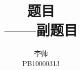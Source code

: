 \documentclass[a4paper]{article}
\title{题目\\ \small ——副题目}
\author{李帅\\PB10000313}
\begin{document}
\maketitle
\tableofcontents
\pagebreak
\end{document}
